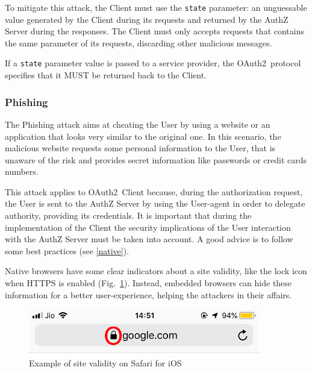 \documentclass[a4paper,12pt]{article}
\def\oauth{OAuth2\xspace}
\def\myfig#1{Fig.~#1\xspace}
\begin{document}
To mitigate this attack, the Client must use the \texttt{state} parameter: an unguessable value generated by the Client during its requests and returned by the AuthZ Server during the responses. The Client must only accepts requests that contains the same parameter of its requests, discarding other malicious messages.

If a \texttt{state} parameter value is passed to a service provider, the \oauth\ protocol specifies that it MUST be returned back to the Client.

\subsubsection{Phishing}
\label{phishing}
The Phishing attack aims at cheating the User by using a website or an application that looks very similar to the original one. In this scenario, the malicious website requests some personal information to the User, that is unaware of the risk and provides secret information like passwords or credit cards numbers.  

This attack applies to \oauth\ Client because, during the authorization request, the User is sent to the AuthZ Server by using the User-agent in order to delegate authority, providing its credentials. It is important that during the implementation of the Client the security implications of the User interaction with the AuthZ Server must be taken into account. A good advice is to follow some best practices (see \ref{native}).

Native browsers have some clear indicators about a site validity, like the lock icon when HTTPS is enabled (\myfig{\ref{fig:ioslock}}). Instead, embedded browsers can hide these information for a better user-experience, helping the attackers in their affairs.

\begin{figure}[ht]
    \centering
    \includegraphics[width=0.9\textwidth]{figures/oie_toIlpPOFRMdK.png}
    \caption{Example of site validity on Safari for iOS}
    \label{fig:ioslock}
\end{figure}


\end{document}
